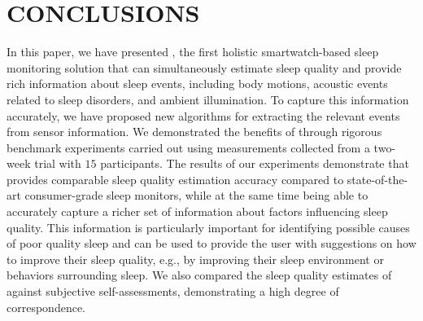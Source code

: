\section{CONCLUSIONS}
In this paper, we have presented {\systemname}, the first holistic smartwatch-based sleep monitoring solution that can simultaneously
estimate sleep quality and provide rich information about sleep events, including body motions, acoustic events related to sleep disorders,
and ambient illumination. To capture this information accurately, we have proposed new algorithms for extracting the relevant events from
sensor information. We demonstrated the benefits of {\systemname} through rigorous benchmark experiments carried out using measurements
collected from a two-week trial with $15$ participants. The results of our experiments demonstrate that {\systemname} provides comparable
sleep quality estimation accuracy compared to state-of-the-art consumer-grade sleep monitors, while at the same time being able to
accurately capture a richer set of information about factors influencing sleep quality. This information is particularly important for
identifying possible causes of poor quality sleep and can be used to provide the user with suggestions on how to improve their sleep
quality, e.g., by improving their sleep environment or behaviors surrounding sleep. We also compared the sleep quality estimates of
{\systemname} against subjective self-assessments, demonstrating a high degree of correspondence.
